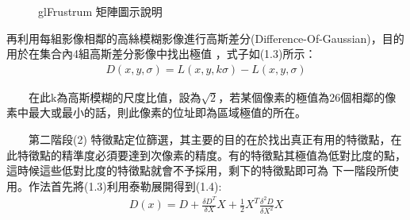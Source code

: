 \begin{figure}
  \begin{center}
  \end{center}
  \caption{glFrustrum 矩陣圖示說明}
  \label{fig:SIFT_explanation}
\end{figure}

  再利用每組影像相鄰的高絲模糊影像進行高斯差分(Difference-Of-Gaussian)，目的用於在集合內4組高斯差分影像中找出極值
  ，式子如(1.3)所示：    
\begin{align}
  D(x,y,\sigma) = L(x,y,k\sigma)-L(x,y,\sigma)
\end{align}

　　在此k為高斯模糊的尺度比值，設為$\sqrt{2}$，若某個像素的極值為26個相鄰的像素中最大或最小的話，則此像素的位址即為區域極值的所在。

　　第二階段(2) 特徵點定位篩選，其主要的目的在於找出真正有用的特徵點，在此特徵點的精準度必須要達到次像素的精度。有的特徵點其極值為低對比度的點，這時候這些低對比度的特徵點就會不予採用，剩下的特徵點即可為
下一階段所使用。作法首先將(1.3)利用泰勒展開得到(1.4): 
\begin{align}
  D(x) = D + \frac{\delta D^T}{\delta X}X + \frac{1}{2}X^T\frac{\delta^2 D}{\delta X^2}X
\end{align}

